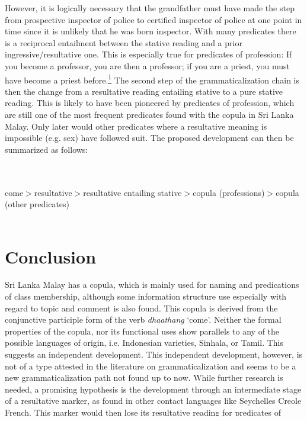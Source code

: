 \documentclass[a4paper,12pt]{article}
\newcommand{\trs}[2]{{\em #1\em} `#2'}
\newcommand{\ea}{\\\\}
\newcommand{\z}{\\\\}
\begin{document}
However, it is logically necessary that the grandfather must have made the step from prospective inspector of police to certified inspector of police at one point in time since it is unlikely that he was born inspector. With many predicates there is a reciprocal entailment between the stative reading and a prior ingressive/resultative one. This is especially true for predicates of profession: If you become a professor, you are then a professor; if you are a priest, you must have become a priest before.\footnote{A similar case of resultative entailing a subsequent stative reading is Latin \em cognovi \em in the perfect, literally `I have learnt', which very often means `I know now' with a present reading.} The second step of the grammaticalization chain is then the change from a resultative reading entailing stative to a pure stative reading. This is likely to have been pioneered by predicates of profession, which are still one of the most frequent predicates found with the copula in Sri Lanka Malay. Only later would other predicates where a resultative meaning is impossible (e.g. sex) have followed suit. The proposed development can then be summarized as follows:

\small
\ea come$>$resultative$>$resultative entailing stative$>$copula (professions)$>$copula (other predicates)\z
\normalsize
 

\section{Conclusion}
Sri Lanka Malay has a copula, which is mainly used for naming and predications of class membership, although some information structure use especially with regard to topic and comment is also found. This copula is derived from the conjunctive participle form of the verb \trs{dhaathang}{come}. Neither the formal properties of the copula, nor its functional uses show parallels to any of the possible languages of origin, i.e. Indonesian varieties, Sinhala, or Tamil. This suggests an independent development. This independent development, however, is not of a type attested in the literature on grammaticalization and seems to be a new grammaticalization path not found up to now. While further research is needed, a promising hypothesis is the development through an intermediate stage of a resultative marker, as found in other contact languages like Seychelles Creole French. This marker would then lose its resultative reading for predicates of profession and become a semantically void copula, which then spreads to other types of intransitive predication.
 



\end{document}
